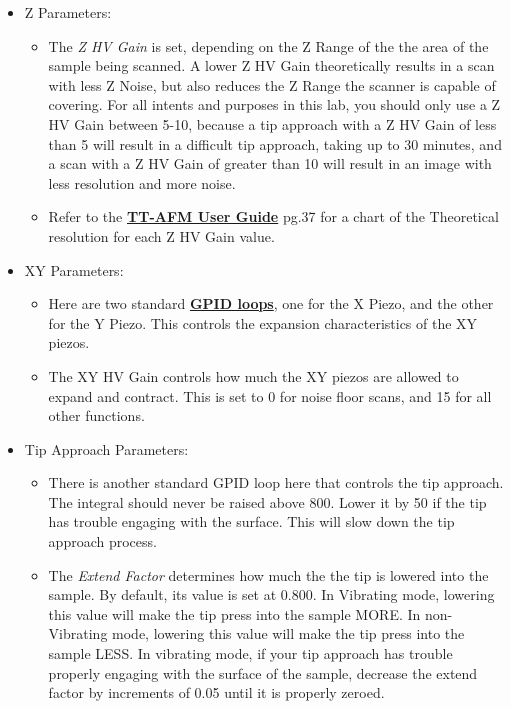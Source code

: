 \documentclass{../lab}
\begin{document}
\begin{itemize}
    \item ​Z Parameters:

    \begin{itemize}
        \item ​The \emph{Z HV Gain} is set, depending on the Z Range of the the area of the sample being scanned.  A lower Z HV Gain theoretically results in a scan with less Z Noise, but also reduces the Z Range the scanner is capable of covering.  For all intents and purposes in this lab, you should only use a Z HV Gain between 5-10, because a tip approach with a Z HV Gain of less than 5 will result in a difficult tip approach, taking up to 30 minutes, and a scan with a Z HV Gain of greater than 10 will result in an image with less resolution and more noise.

        \item Refer to the \href{http://experimentationlab.berkeley.edu/tt-afmuserguidev2.2}{\textbf{TT-AFM User Guide}} pg.37 for a chart of the Theoretical resolution for each Z HV Gain value.

    \end{itemize}

    \item XY Parameters:

    \begin{itemize}
        \item ​Here are two standard \href{https://en.wikipedia.org/wiki/PID\_controller}{\textbf{GPID loops}}, one for the X Piezo, and the other for the Y Piezo.  This controls the expansion characteristics of the XY piezos.

        \item The XY HV Gain controls how much the XY piezos are allowed to expand and contract.  This is set to 0 for noise floor scans, and 15 for all other functions.

    \end{itemize}

    \item Tip Approach Parameters:

    \begin{itemize}
        \item ​There is another standard GPID loop here that controls the tip approach.  The integral should never be raised above 800. Lower it by 50 if the tip has trouble engaging with the surface.  This will slow down the tip approach process.

        \item The \emph{Extend Factor} determines how much the the tip is lowered into the sample.  By default, its value is set at 0.800. In Vibrating mode, lowering this value will make the tip press into the sample MORE.  In non-Vibrating mode, lowering this value will make the tip press into the sample LESS.  In vibrating mode, if your tip approach has trouble properly engaging with the surface of the sample, decrease the extend factor by increments of 0.05 until it is properly zeroed.


\end{itemize}
\end{itemize}
\end{document}
